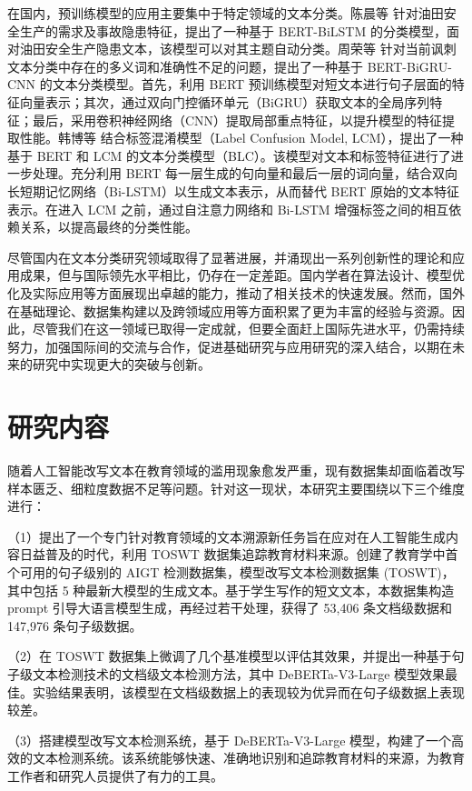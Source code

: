 在国内，预训练模型的应用主要集中于特定领域的文本分类。陈晨等 \cite{KXJS202429028} 针对油田安全生产的需求及事故隐患特征，提出了一种基于 BERT-BiLSTM 的分类模型，面对油田安全生产隐患文本，该模型可以对其主题自动分类。周荣等 \cite{DLXZ20240909001} 针对当前讽刺文本分类中存在的多义词和准确性不足的问题，提出了一种基于 BERT-BiGRU-CNN 的文本分类模型。首先，利用 BERT 预训练模型对短文本进行句子层面的特征向量表示；其次，通过双向门控循环单元（BiGRU）获取文本的全局序列特征；最后，采用卷积神经网络（CNN）提取局部重点特征，以提升模型的特征提取性能。韩博等 \cite{NJYD202403012} 结合标签混淆模型（Label Confusion Model, LCM），提出了一种基于 BERT 和 LCM 的文本分类模型（BLC）。该模型对文本和标签特征进行了进一步处理。充分利用 BERT 每一层生成的句向量和最后一层的词向量，结合双向长短期记忆网络（Bi-LSTM）以生成文本表示，从而替代 BERT 原始的文本特征表示。在进入 LCM 之前，通过自注意力网络和 Bi-LSTM 增强标签之间的相互依赖关系，以提高最终的分类性能。

尽管国内在文本分类研究领域取得了显著进展，并涌现出一系列创新性的理论和应用成果，但与国际领先水平相比，仍存在一定差距。国内学者在算法设计、模型优化及实际应用等方面展现出卓越的能力，推动了相关技术的快速发展。然而，国外在基础理论、数据集构建以及跨领域应用等方面积累了更为丰富的经验与资源。因此，尽管我们在这一领域已取得一定成就，但要全面赶上国际先进水平，仍需持续努力，加强国际间的交流与合作，促进基础研究与应用研究的深入结合，以期在未来的研究中实现更大的突破与创新。

\section{研究内容}
\label{sec:intro-contribution}

随着人工智能改写文本在教育领域的滥用现象愈发严重，现有数据集却面临着改写样本匮乏、细粒度数据不足等问题。针对这一现状，本研究主要围绕以下三个维度进行：

（1）提出了一个专门针对教育领域的文本溯源新任务旨在应对在人工智能生成内容日益普及的时代，利用 TOSWT 数据集追踪教育材料来源。创建了教育学中首个可用的句子级别的 AIGT 检测数据集，模型改写文本检测数据集 (TOSWT)，其中包括 5 种最新大模型的生成文本。基于学生写作的短文文本，本数据集构造 prompt 引导大语言模型生成，再经过若干处理，获得了 53,406 条文档级数据和 147,976 条句子级数据。

（2）在 TOSWT 数据集上微调了几个基准模型以评估其效果，并提出一种基于句子级文本检测技术的文档级文本检测方法，其中 DeBERTa-V3-Large 模型效果最佳。实验结果表明，该模型在文档级数据上的表现较为优异而在句子级数据上表现较差。

（3）搭建模型改写文本检测系统，基于 DeBERTa-V3-Large 模型，构建了一个高效的文本检测系统。该系统能够快速、准确地识别和追踪教育材料的来源，为教育工作者和研究人员提供了有力的工具。

